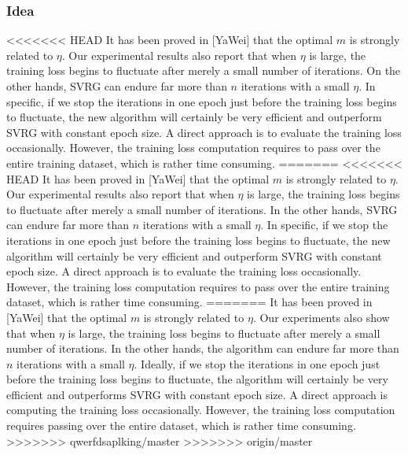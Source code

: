 \documentclass[conference]{IEEEtran}
\begin{document}
 \subsubsection{Idea}
<<<<<<< HEAD
 It has been proved in [YaWei] that the optimal $m$ is strongly related to $\eta$. Our experimental results also report that when $\eta$ is large, the training loss begins to fluctuate after merely a small number of iterations. On the other hands, SVRG can endure far more than $n$ iterations with a small $\eta$. In specific, if we stop the iterations in one epoch just before the training loss begins to fluctuate, the new algorithm will certainly be very efficient and outperform SVRG with constant epoch size. A direct approach is to evaluate the training loss occasionally. However, the training loss computation requires to pass over the entire training dataset, which is rather time consuming. 
=======
<<<<<<< HEAD
 It has been proved in [YaWei] that the optimal $m$ is strongly related to $\eta$. Our experimental results also report that when $\eta$ is large, the training loss begins to fluctuate after merely a small number of iterations. In the other hands, SVRG can endure far more than $n$ iterations with a small $\eta$. In specific, if we stop the iterations in one epoch just before the training loss begins to fluctuate, the new algorithm will certainly be very efficient and outperform SVRG with constant epoch size. A direct approach is to evaluate the training loss occasionally. However, the training loss computation requires to pass over the entire training dataset, which is rather time consuming. 
=======
 It has been proved in [YaWei] that the optimal $m$ is strongly related to $\eta$. Our experiments also show that when $\eta$ is large, the training loss begins to fluctuate after merely a small number of iterations. In the other hands, the algorithm can endure far more than $n$ iterations with a small $\eta$. Ideally, if we stop the iterations in one epoch just before the training loss begins to fluctuate, the algorithm will certainly be very efficient and outperforms SVRG with constant epoch size. A direct approach is computing the training loss occasionally. However, the training loss computation requires passing over the entire dataset, which is rather time consuming. 
>>>>>>> qwerfdsaplking/master
>>>>>>> origin/master
\end{document}
